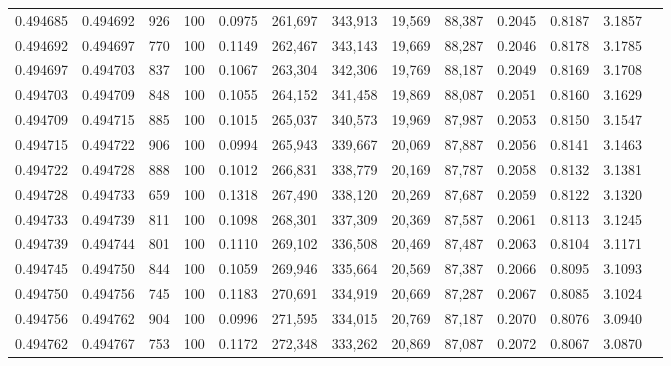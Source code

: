 \begin{tabular}{rrrrrrrrrrrrr}
0.494685 & 0.494692 &   926 & 100 &                                     0.0975 & 261,697 & 343,913 &  19,569 &  88,387 & 0.2045 & 0.8187 & 3.1857 \\
0.494692 & 0.494697 &   770 & 100 &                                     0.1149 & 262,467 & 343,143 &  19,669 &  88,287 & 0.2046 & 0.8178 & 3.1785 \\
0.494697 & 0.494703 &   837 & 100 &                                     0.1067 & 263,304 & 342,306 &  19,769 &  88,187 & 0.2049 & 0.8169 & 3.1708 \\
0.494703 & 0.494709 &   848 & 100 &                                     0.1055 & 264,152 & 341,458 &  19,869 &  88,087 & 0.2051 & 0.8160 & 3.1629 \\
0.494709 & 0.494715 &   885 & 100 &                                     0.1015 & 265,037 & 340,573 &  19,969 &  87,987 & 0.2053 & 0.8150 & 3.1547 \\
0.494715 & 0.494722 &   906 & 100 &                                     0.0994 & 265,943 & 339,667 &  20,069 &  87,887 & 0.2056 & 0.8141 & 3.1463 \\
0.494722 & 0.494728 &   888 & 100 &                                     0.1012 & 266,831 & 338,779 &  20,169 &  87,787 & 0.2058 & 0.8132 & 3.1381 \\
0.494728 & 0.494733 &   659 & 100 &                                     0.1318 & 267,490 & 338,120 &  20,269 &  87,687 & 0.2059 & 0.8122 & 3.1320 \\
0.494733 & 0.494739 &   811 & 100 &                                     0.1098 & 268,301 & 337,309 &  20,369 &  87,587 & 0.2061 & 0.8113 & 3.1245 \\
0.494739 & 0.494744 &   801 & 100 &                                     0.1110 & 269,102 & 336,508 &  20,469 &  87,487 & 0.2063 & 0.8104 & 3.1171 \\
0.494745 & 0.494750 &   844 & 100 &                                     0.1059 & 269,946 & 335,664 &  20,569 &  87,387 & 0.2066 & 0.8095 & 3.1093 \\
0.494750 & 0.494756 &   745 & 100 &                                     0.1183 & 270,691 & 334,919 &  20,669 &  87,287 & 0.2067 & 0.8085 & 3.1024 \\
0.494756 & 0.494762 &   904 & 100 &                                     0.0996 & 271,595 & 334,015 &  20,769 &  87,187 & 0.2070 & 0.8076 & 3.0940 \\
0.494762 & 0.494767 &   753 & 100 &                                     0.1172 & 272,348 & 333,262 &  20,869 &  87,087 & 0.2072 & 0.8067 & 3.0870 \\

\end{tabular}
